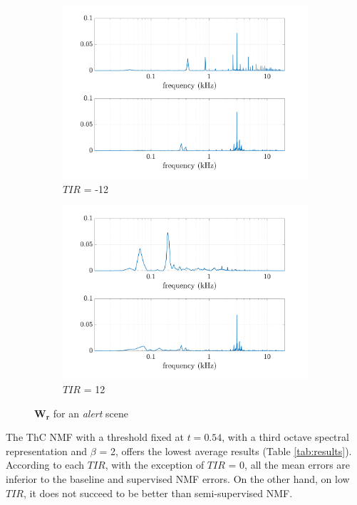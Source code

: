 \documentclass[twocolumn,a4paper,10pt]{article}
\begin{document}
\begin{figure}
    \centering
    \begin{subfigure}[t]{0.45\textwidth}
        \centering
        \includegraphics[width=\linewidth]{figures/Y_alert_TPR_-12_01.pdf}
        \caption{$TIR$ = -12}
        \label{fig:Y_alert-12}
    \end{subfigure}%
    \hfill
    \begin{subfigure}[t]{0.45\textwidth}
        \centering
        \includegraphics[width=\linewidth]{figures/Y_alert_TPR_12_01.pdf}
        \caption{$TIR$ = 12}
		\label{fig:Y_alert_12}
    \end{subfigure}
    \caption{$\mathbf{W_r}$ for an \textit{alert} scene}
\end{figure}


The ThC NMF with a threshold fixed at $t = 0.54$, with a third octave spectral representation and $\beta$ = 2,  offers the lowest average results (Table \ref{tab:results}). According to each $TIR$, with the exception of $TIR$ = 0, all the mean errors are inferior to the baseline and supervised NMF errors. On the other hand, on low $TIR$, it does not succeed to be better than semi-supervised NMF.
\end{document}
